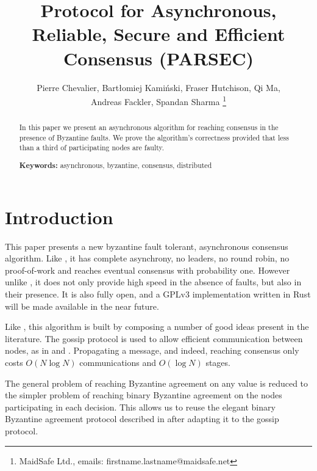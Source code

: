 \documentclass[a4paper,fleqn]{article}
\begin{document}
\renewcommand{\topfraction}{0.85}
\renewcommand{\textfraction}{0.1}
\renewcommand{\floatpagefraction}{0.75}
\setlength\parindent{0.5cm}
\setcounter{tocdepth}{3}

\theoremstyle{definition}
\newtheorem{defn}{Definition}[section]
\theoremstyle{plain}
\newtheorem{thm}{Theorem}[section]
\newtheorem{lem}[thm]{Lemma}

\title{Protocol for Asynchronous, Reliable, Secure and Efficient Consensus (PARSEC)}

\author{Pierre Chevalier, Bartłomiej Kamiński, Fraser Hutchison, Qi Ma, \\
Andreas Fackler, Spandan Sharma
\thanks{MaidSafe Ltd., emails: firstname.lastname@maidsafe.net}}%

\maketitle


\begin{abstract}
	In this paper we present an asynchronous algorithm for reaching consensus in the presence of
	Byzantine faults. We prove the algorithm's correctness provided that less than a third of
	participating nodes are faulty.

	\textbf{Keywords:} asynchronous, byzantine, consensus, distributed
\end{abstract}


\section{Introduction}

This paper presents a new byzantine fault tolerant, asynchronous consensus algorithm. Like
\cite{hg}, it has complete asynchrony, no leaders, no round robin, no proof-of-work and reaches
eventual consensus with probability one. However unlike \cite {hg}, it does not only provide high
speed in the absence of faults, but also in their presence. It is also fully open, and a GPLv3
implementation written in Rust will be made available in the near future.

Like \cite{hbbft}, this algorithm is built by composing a number of good ideas present in the
literature. The gossip protocol is used to allow efficient communication between nodes, as in
\cite{hg} and \cite{snowflake}. Propagating a message, and indeed, reaching consensus only
costs $O(N\log{N})$ communications and $O(\log{N})$ stages.

The general problem of reaching Byzantine agreement on any value is reduced to the simpler problem
of reaching binary Byzantine agreement on the nodes participating in each decision. This allows us
to reuse the elegant binary Byzantine agreement protocol described in \cite{aba} after adapting it
to the gossip protocol.
\end{document}
